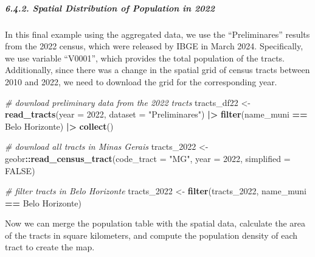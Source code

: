 \documentclass[
]{article}
\newenvironment{Shaded}{\begin{snugshade}}{\end{snugshade}}
\newcommand{\AttributeTok}[1]{\textcolor[rgb]{0.13,0.29,0.53}{#1}}
\newcommand{\CommentTok}[1]{\textcolor[rgb]{0.56,0.35,0.01}{\textit{#1}}}
\newcommand{\ConstantTok}[1]{\textcolor[rgb]{0.56,0.35,0.01}{#1}}
\newcommand{\DecValTok}[1]{\textcolor[rgb]{0.00,0.00,0.81}{#1}}
\newcommand{\FunctionTok}[1]{\textcolor[rgb]{0.13,0.29,0.53}{\textbf{#1}}}
\newcommand{\NormalTok}[1]{#1}
\newcommand{\OtherTok}[1]{\textcolor[rgb]{0.56,0.35,0.01}{#1}}
\newcommand{\SpecialCharTok}[1]{\textcolor[rgb]{0.81,0.36,0.00}{\textbf{#1}}}
\newcommand{\StringTok}[1]{\textcolor[rgb]{0.31,0.60,0.02}{#1}}
\begin{document}
\subparagraph{6.4.2. Spatial Distribution of Population in
2022}\label{spatial-distribution-of-population-in-2022}

In this final example using the aggregated data, we use the
``Preliminares'' results from the 2022 census, which were released by
IBGE in March 2024. Specifically, we use variable ``V0001'', which
provides the total population of the tracts. Additionally, since there
was a change in the spatial grid of census tracts between 2010 and 2022,
we need to download the grid for the corresponding year.

\begin{Shaded}
\begin{Highlighting}[]
\CommentTok{\# download preliminary data from the 2022 tracts}
\NormalTok{tracts\_df22 }\OtherTok{\textless{}{-}} \FunctionTok{read\_tracts}\NormalTok{(}\AttributeTok{year =} \DecValTok{2022}\NormalTok{,}
                          \AttributeTok{dataset =} \StringTok{"Preliminares"}\NormalTok{) }\SpecialCharTok{|\textgreater{}}
               \FunctionTok{filter}\NormalTok{(name\_muni }\SpecialCharTok{==} \StringTok{\textquotesingle{}Belo Horizonte\textquotesingle{}}\NormalTok{) }\SpecialCharTok{|\textgreater{}}
               \FunctionTok{collect}\NormalTok{()}

\CommentTok{\# download all tracts in Minas Gerais}
\NormalTok{tracts\_2022 }\OtherTok{\textless{}{-}}\NormalTok{ geobr}\SpecialCharTok{::}\FunctionTok{read\_census\_tract}\NormalTok{(}\AttributeTok{code\_tract =} \StringTok{"MG"}\NormalTok{,}
                                        \AttributeTok{year =} \DecValTok{2022}\NormalTok{,}
                                        \AttributeTok{simplified =} \ConstantTok{FALSE}\NormalTok{)}

\CommentTok{\# filter tracts in Belo Horizonte}
\NormalTok{tracts\_2022 }\OtherTok{\textless{}{-}} \FunctionTok{filter}\NormalTok{(tracts\_2022, name\_muni }\SpecialCharTok{==} \StringTok{\textquotesingle{}Belo Horizonte\textquotesingle{}}\NormalTok{)}
\end{Highlighting}
\end{Shaded}

Now we can merge the population table with the spatial data, calculate
the area of the tracts in square kilometers, and compute the population
density of each tract to create the map.
\end{document}
